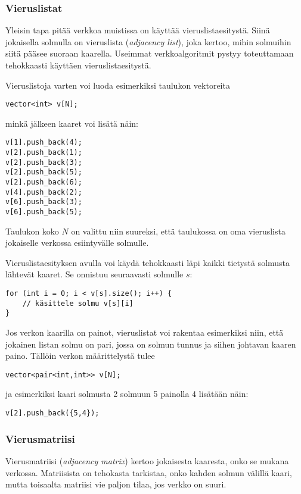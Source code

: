 \subsubsection*{Vieruslistat}

Yleisin tapa pitää verkkoa muistissa
on käyttää vieruslistaesitystä.
Siinä jokaisella solmulla on vieruslista (\textit{adjacency list}),
joka kertoo, mihin solmuihin siitä pääsee suoraan kaarella.
Useimmat verkkoalgoritmit pystyy toteuttamaan tehokkaasti
käyttäen vieruslistaesitystä.

Vieruslistoja varten voi luoda esimerkiksi taulukon vektoreita
\begin{lstlisting}
vector<int> v[N];
\end{lstlisting}
minkä jälkeen kaaret voi lisätä näin:
\begin{lstlisting}
v[1].push_back(4);
v[2].push_back(1);
v[2].push_back(3);
v[2].push_back(5);
v[2].push_back(6);
v[4].push_back(2);
v[6].push_back(3);
v[6].push_back(5);
\end{lstlisting}

Taulukon koko $N$ on valittu niin suureksi,
että taulukossa on oma vieruslista
jokaiselle verkossa esiintyvälle solmulle.

Vieruslistaesityksen avulla voi käydä tehokkaasti
läpi kaikki tietystä solmusta lähtevät kaaret.
Se onnistuu seuraavasti solmulle $s$:
\begin{lstlisting}
for (int i = 0; i < v[s].size(); i++) {
    // käsittele solmu v[s][i]
}
\end{lstlisting}

Jos verkon kaarilla on painot,
vieruslistat voi rakentaa esimerkiksi niin,
että jokainen listan solmu on pari,
jossa on solmun tunnus ja siihen johtavan kaaren paino.
Tällöin verkon määrittelystä tulee
\begin{lstlisting}
vector<pair<int,int>> v[N];
\end{lstlisting}
ja esimerkiksi kaari solmusta 2 solmuun 5 painolla 4 lisätään näin:
\begin{lstlisting}
v[2].push_back({5,4});
\end{lstlisting}

\subsubsection*{Vierusmatriisi}

Vierusmatriisi (\textit{adjacency matrix})
kertoo jokaisesta kaaresta,
onko se mukana verkossa.
Matriisista on tehokasta tarkistaa,
onko kahden solmun välillä kaari,
mutta toisaalta matriisi vie paljon tilaa,
jos verkko on suuri.

